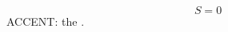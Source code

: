 \documentclass{article}
\begin{document}
\begin{equation} S=0 \label{Schr\"odinger} \end{equation}
ACCENT: the .
\end{document}
